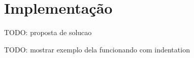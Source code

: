 \section{Implementação}
TODO: proposta de solucao

TODO: mostrar exemplo dela funcionando com indentation
